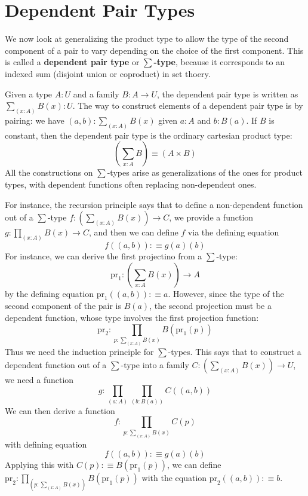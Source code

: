\section{Dependent Pair Types}

We now look at generalizing the product type to allow the type of the second component of a pair to vary depending on the choice of the first component. This is called a \textbf{dependent pair type} or \textbf{$\sum$-type}, because it corresponds to an indexed sum (disjoint union or coproduct) in set thoery.

Given a type $A:U$ and a family $B:A\rightarrow U$, the dependent pair type is written as $\sum_{(x:A)}B(x):U$. The way to construct elements of a dependent pair type is by pairing: we have $(a,b) : \sum_{(x:A)}B(x)$ given $a :A$ and $b:B(a)$. If $B$ is constant, then the dependent pair type is the ordinary cartesian product type: $$\left(\sum_{x:A}B\right) \equiv (A\times B)$$
All the constructions on $\sum$-types arise as generalizations of the ones for product types, with dependent functions often replacing non-dependent ones.

For instance, the recursion principle says that to define a non-dependent function out of a $\sum$-type $f:\left(\sum_{(x:A)}B(x)\right)\rightarrow C$, we provide a function $g:\prod_{(x:A)}B(x)\rightarrow C$, and then we can define $f$ via the defining equation $$f((a,b)) :\equiv g(a)(b)$$
For instance, we can derive the first projectino from a $\sum$-type: $$\text{pr}_1:\left(\sum_{x:A}B(x)\right)\rightarrow A$$
by the defining equation $\text{pr}_1((a,b)) :\equiv a$. However, since the type of the second component of the pair is $B(a)$, the second projection must be a dependent function, whose type involves the first projection function: $$\text{pr}_2:\prod_{p:\sum_{(x:A)}B(x)}B(\text{pr}_1(p))$$
Thus we need the induction principle for $\sum$-types. This says that to construct a dependent function out of a $\sum$-type into a family $C:\left(\sum_{(x:A)}B(x)\right)\rightarrow U$, we need a function $$g:\prod_{(a:A)}\prod_{(b:B(a))}C((a,b))$$
We can then derive a function $$f:\prod_{p:\sum_{(x:A)}B(x)}C(p)$$
with defining equation $$f((a,b)) :\equiv g(a)(b)$$
Applying this with $C(p) :\equiv B(\text{pr}_1(p))$, we can define $\text{pr}_2:\prod_{(p:\sum_{(x:A)}B(x))}B(\text{pr}_1(p))$ with the equation $\text{pr}_2((a,b)) :\equiv b$.

